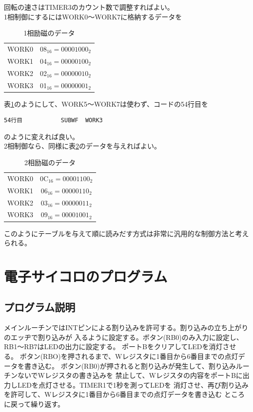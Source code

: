 \documentclass[a4paper,12pt]{ujarticle}
\begin{document}
     回転の速さはTIMER3のカウント数で調整すればよい。
     \\

     1相制御にするにはWORK0〜WORK7に格納するデータを
     \begin{table}[htbp]
      \begin{center}
       \caption{1相励磁のデータ}
       \label{table:1-data}
       \begin{tabular}{|c|c|}
        \hline
        WORK0 & 08$_{16}=00001000_2$\\
        WORK1 & 04$_{16}=00000100_2$\\
        WORK2 & 02$_{16}=00000010_2$\\
        WORK3 & 01$_{16}=00000001_2$\\ \hline
       \end{tabular}
      \end{center}
     \end{table}
     表\ref{table:1-data}のようにして、WORK5〜WORK7は使わず、コードの54行目を
     \begin{lstlisting}[basicstyle=\ttfamily\footnotesize, frame=single]
54行目           SUBWF  WORK3
     \end{lstlisting}
     のように変えれば良い。
     \\

     2相制御なら、同様に表\ref{table:2-data}のデータを与えればよい。
     \begin{table}[htbp]
      \begin{center}
       \caption{2相励磁のデータ}
       \label{table:2-data}
       \begin{tabular}{|c|c|} \hline
        WORK0 & 0C$_{16}=00001100_2$\\
        WORK1 & 06$_{16}=00000110_2$\\
        WORK2 & 03$_{16}=00000011_2$\\
        WORK3 & 09$_{16}=00001001_2$\\ \hline
       \end{tabular}
      \end{center}
     \end{table}

     このようにテーブルを与えて順に読みだす方式は非常に汎用的な制御方法と考えられる。
     \clearpage
\section{電子サイコロのプログラム}
  \subsection{プログラム説明}
  メインルーチンではINTピンによる割り込みを許可する。割り込みの立ち上がりのエッヂで割り込みが
  入るように設定する。ボタン(RB0)のみ入力に設定し、RB1〜RB7はLEDの出力に設定する。
  ポートBをクリアしてLEDを消灯させる。
  ボタン(RBO)を押されるまで、Wレジスタに1番目から6番目までの点灯データを書き込む。
  ボタン(RB0)が押されると割り込みが発生して、割り込みルーチンないでWレジスタの書き込みを
  禁止して、Wレジスタの内容をポートBに出力しLEDを点灯させる。TIMER1で1秒を測ってLEDを
  消灯させ、再び割り込みを許可して、Wレジスタに1番目から6番目までの点灯データを書き込む
  ところに戻って繰り返す。
\end{document}
